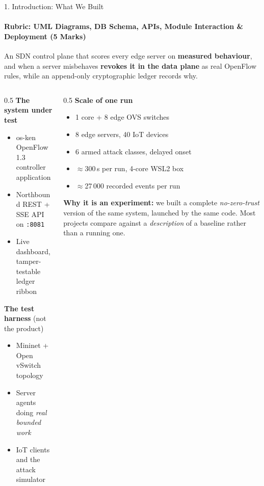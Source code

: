 \documentclass[aspectratio=169, 11pt]{beamer}
\newcommand{\rubric}[1]{Rubric: #1}
\begin{document}
\begin{frame}{1. Introduction: What We Built}
    \framesubtitle{\rubric{UML Diagrams, DB Schema, APIs, Module Interaction \& Deployment (5 Marks)}}
    \scriptsize
    An SDN control plane that scores every edge server on \textbf{measured
    behaviour}, and when a server misbehaves \textbf{revokes it in the data plane}
    as real OpenFlow rules, while an append-only cryptographic ledger records why.

    \vspace{6pt}
    \begin{columns}[T]
      \begin{column}{0.5\textwidth}
        \textbf{The system under test}
        \begin{itemize}\itemsep2pt
          \item os-ken OpenFlow 1.3 controller application
          \item Northbound REST + SSE API on \texttt{:8081}
          \item Live dashboard, tamper-testable ledger ribbon
        \end{itemize}
        \vspace{4pt}
        \textbf{The test harness} (not the product)
        \begin{itemize}\itemsep2pt
          \item Mininet + Open vSwitch topology
          \item Server agents doing \emph{real bounded work}
          \item IoT clients and the attack simulator
        \end{itemize}
      \end{column}
      \begin{column}{0.5\textwidth}
        \textbf{Scale of one run}
        \begin{itemize}\itemsep2pt
          \item 1 core + 8 edge OVS switches
          \item 8 edge servers, 40 IoT devices
          \item 6 armed attack classes, delayed onset
          \item $\approx$300\,s per run, 4-core WSL2 box
          \item $\approx$27\,000 recorded events per run
        \end{itemize}
        \vspace{4pt}
        \textbf{Why it is an experiment:} we built a complete
        \emph{no-zero-trust} version of the same system, launched by the same
        code. Most projects compare against a \emph{description} of a baseline
        rather than a running one.
      \end{column}
    \end{columns}
\end{frame}
\end{document}
